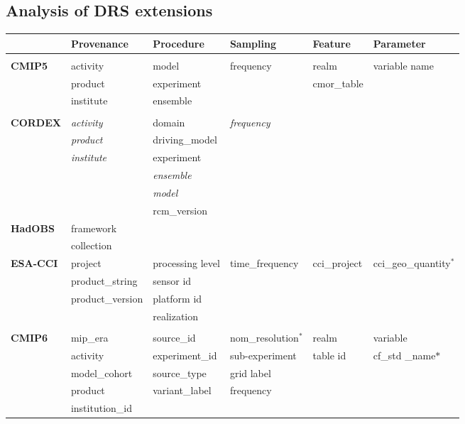 \documentclass[final,1p,times,twocolumn,authoryear]{elsarticle}
\begin{document}
{{\subsection{Analysis of DRS extensions}


\begin{table}[htb!]
\label{tab:drs-schema}
\small
\begin{tabular}{p{1.4cm} p{2.0cm} p{2.1cm} p{2.1cm} p{1.4cm} p{2.0cm} }
	& \textbf{Provenance} & \textbf{Procedure} & \textbf{Sampling} & \textbf{Feature} & \textbf{Parameter} \\[2pt]  \hline 
 \\      
\textbf{CMIP5} & activity & model & frequency & realm & variable name \\ 
	& product & experiment &  & cmor\_table & \    \\ 
	& institute & ensemble & \  & \  & \   \\[2pt]   \hline 
\\[-4pt]      
\textbf{CORDEX} &  {\textit{activity}} & domain &  {\textit{frequency}}   & \  & \    \\ 
                &  {\textit{product}}  & driving\_model  & \  & \  & \    \\ 
                &  {\textit{institute}} & experiment  & \  & \  & \    \\ 
                & &  	 {\textit{ensemble}}   & \  & \  & \    \\ 
                & & 	 {\textit{model}}    & \  & \  & \  \\ 
                & & 	rcm\_version     & \  & \  & \  \\[2pt] 
   \textbf{HadOBS} & framework & \  & \  & \   \\[2pt]
 & 	collection & \  & \  & \  & \    \\[2pt] 
\textbf{ESA-CCI} &  project & processing level & time\_frequency & cci\_project & cci\_geo\_quantity$^*$  \\ 
& 	product\_string & sensor id & \  & \  & \  \\ 
& 	product\_version & platform id & \  & \  & \   \\ 
\ & \ & realization & \ & \ & \\[2pt]  \hline
 \\[-4pt]
 \textbf{CMIP6} & mip\_era & source\_id & nom\_resolution$^*$ & realm& variable \\
  & activity & experiment\_id & sub-experiment & table id  & cf\_std \_name$*$ \\
  & model\_cohort & source\_type & grid label &  \\
  & product &  variant\_label & frequency & \\
  & institution\_id &  & & \\[2pt] \hline


\end{tabular}
\end{table}}}
\end{document}
